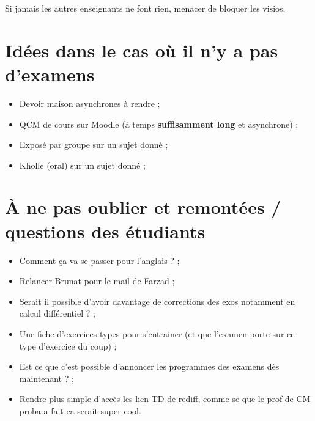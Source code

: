 \documentclass{article}
\begin{document}
Si jamais les autres enseignants ne font rien, menacer de bloquer les visios.\\

\section{Idées dans le cas où il n'y a pas d'examens}

\begin{itemize}
    \item Devoir maison asynchrones à rendre ;
    \item QCM de cours sur Moodle (à temps \textbf{suffisamment long} et asynchrone) ;
    \item Exposé par groupe sur un sujet donné ;
    \item Kholle (oral) sur un sujet donné ;
\end{itemize}

\section{À ne pas oublier et remontées / questions des étudiants}

\begin{itemize}
    \item Comment ça va se passer pour l'anglais ? ;
    \item Relancer Brunat pour le mail de Farzad ;
    \item Serait il possible d'avoir davantage de corrections des exos notamment en calcul différentiel ? ;
    \item Une fiche d’exercices types pour s’entrainer (et que l’examen porte sur ce type d’exercice du coup) ;
    \item Est ce que c'est possible d'annoncer les programmes des examens dès maintenant ? ;
    \item Rendre plus simple d'accès les lien TD de rediff, comme se que le prof de CM proba a fait ca serait super cool.
\end{itemize}
\end{document}
